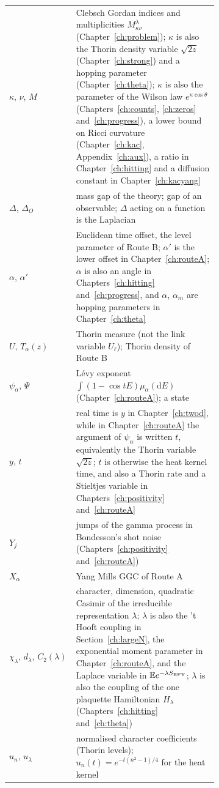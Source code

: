 \begin{longtable}{lp{0.68\linewidth}}
$\kappa$, $\nu$, $M$ & Clebsch Gordan indices and multiplicities $M^\lambda_{\kappa\nu}$ (Chapter~\ref{ch:problem}); $\kappa$ is also the Thorin density variable $\sqrt{2z}$ (Chapter~\ref{ch:strong}) and a hopping parameter (Chapter~\ref{ch:theta}); $\kappa$ is also the parameter of the Wilson law $e^{\kappa\cos\theta}$ (Chapters~\ref{ch:counts}, \ref{ch:zeros} and~\ref{ch:progress}), a lower bound on Ricci curvature (Chapter~\ref{ch:kac}, Appendix~\ref{ch:aux}), a ratio in Chapter~\ref{ch:hitting} and a diffusion constant in Chapter~\ref{ch:kacyang} \\
$\Delta$, $\Delta_O$ & mass gap of the theory; gap of an observable; $\Delta$ acting on a function is the Laplacian \\
$\alpha$, $\alpha'$ & Euclidean time offset, the level parameter of Route B; $\alpha'$ is the lower offset in Chapter~\ref{ch:routeA}; $\alpha$ is also an angle in Chapters~\ref{ch:hitting} and~\ref{ch:progress}, and $\alpha$, $\alpha_m$ are hopping parameters in Chapter~\ref{ch:theta} \\
$U$, $T_\alpha(z)$ & Thorin measure (not the link variable $U_\ell$); Thorin density of Route B \\
$\psi_\alpha$, $\Psi$ & L\'evy exponent $\int(1-\cos tE)\mu_\alpha(\mathrm dE)$ (Chapter~\ref{ch:routeA}); a state \\
$y$, $t$ & real time is $y$ in Chapter~\ref{ch:twod}, while in Chapter~\ref{ch:routeA} the argument of $\psi_\alpha$ is written $t$, equivalently the Thorin variable $\sqrt{2z}$; $t$ is otherwise the heat kernel time, and also a Thorin rate and a Stieltjes variable in Chapters~\ref{ch:positivity} and~\ref{ch:routeA} \\
$Y_j$ & jumps of the gamma process in Bondesson's shot noise (Chapters~\ref{ch:positivity} and~\ref{ch:routeA}) \\
$X_\alpha$ & Yang Mills GGC of Route A \\
$\chi_\lambda$, $d_\lambda$, $C_2(\lambda)$ & character, dimension, quadratic Casimir of the irreducible representation $\lambda$; $\lambda$ is also the 't Hooft coupling in Section~\ref{ch:largeN}, the exponential moment parameter in Chapter~\ref{ch:routeA}, and the Laplace variable in $\mathbb{E} e^{-\lambda S_{\mathrm{BPY}}}$; $\lambda$ is also the coupling of the one plaquette Hamiltonian $H_\lambda$ (Chapters~\ref{ch:hitting} and~\ref{ch:theta}) \\
$u_n$, $u_\lambda$ & normalised character coefficients (Thorin levels); $u_n(t)=e^{-t(n^2-1)/4}$ for the heat kernel \\

\end{longtable}
